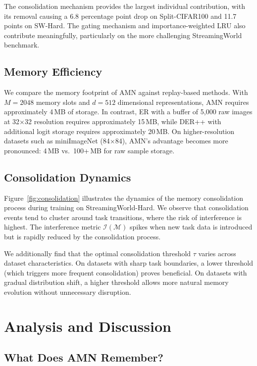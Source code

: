 \documentclass[11pt]{article}
\begin{document}
The consolidation mechanism provides the largest individual contribution, with its removal causing a 6.8 percentage point drop on Split-CIFAR100 and 11.7 points on SW-Hard. The gating mechanism and importance-weighted LRU also contribute meaningfully, particularly on the more challenging StreamingWorld benchmark.

\subsection{Memory Efficiency}

We compare the memory footprint of AMN against replay-based methods. With $M = 2048$ memory slots and $d = 512$ dimensional representations, AMN requires approximately 4\,MB of storage. In contrast, ER with a buffer of 5,000 raw images at 32$\times$32 resolution requires approximately 15\,MB, while DER++ with additional logit storage requires approximately 20\,MB. On higher-resolution datasets such as miniImageNet (84$\times$84), AMN's advantage becomes more pronounced: 4\,MB vs.\ 100+\,MB for raw sample storage.

\subsection{Consolidation Dynamics}

Figure~\ref{fig:consolidation} illustrates the dynamics of the memory consolidation process during training on StreamingWorld-Hard. We observe that consolidation events tend to cluster around task transitions, where the risk of interference is highest. The interference metric $\mathcal{I}(\mathcal{M})$ spikes when new task data is introduced but is rapidly reduced by the consolidation process.

We additionally find that the optimal consolidation threshold $\tau$ varies across dataset characteristics. On datasets with sharp task boundaries, a lower threshold (which triggers more frequent consolidation) proves beneficial. On datasets with gradual distribution shift, a higher threshold allows more natural memory evolution without unnecessary disruption.

\section{Analysis and Discussion}
\label{sec:analysis}

\subsection{What Does AMN Remember?}
\end{document}
